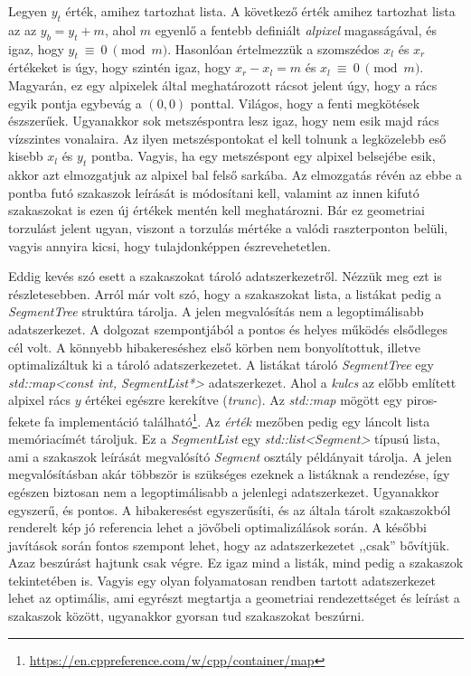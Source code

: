 \documentclass[12pt]{report}
\theoremstyle{definition}
\newcommand{\func}[1]{{\textsl{#1}}}
\begin{document}
Legyen $y_t$ érték, amihez tartozhat lista. A következő érték amihez tartozhat
lista az az $y_b = y_t + m$, ahol $m$ egyenlő a fentebb definiált
\emph{alpixel} magasságával, és igaz, hogy $y_t~\equiv~0~\pmod{m}$. Hasonlóan
értelmezzük a szomszédos $x_l$ és $x_r$ értékeket is úgy, hogy szintén igaz,
hogy $x_r - x_l = m$ és $x_l~\equiv~0~\pmod{m}$. Magyarán, ez egy alpixelek
által meghatározott rácsot jelent úgy, hogy a rács egyik pontja egybevág a $(0,
0)$ ponttal. Világos, hogy a fenti megkötések észszerűek. Ugyanakkor sok
metszéspontra lesz igaz, hogy nem esik majd rács vízszintes vonalaira. Az ilyen
metszéspontokat el kell tolnunk a legközelebb eső kisebb $x_l$ és $y_t$ pontba.
Vagyis, ha egy metszéspont egy alpixel belsejébe esik, akkor azt elmozgatjuk az
alpixel bal felső sarkába. Az elmozgatás révén az ebbe a pontba futó szakaszok
leírását is módosítani kell, valamint az innen kifutó szakaszokat is ezen új
értékek mentén kell meghatározni. Bár ez geometriai torzulást jelent ugyan,
viszont a torzulás mértéke a valódi raszterponton belüli, vagyis annyira kicsi,
hogy tulajdonképpen észrevehetetlen.

Eddig kevés szó esett a szakaszokat tároló adatszerkezetről. Nézzük meg ezt is
részletesebben. Arról már volt szó, hogy a szakaszokat lista, a listákat pedig
a \func{SegmentTree} struktúra tárolja. A jelen megvalósítás nem a
legoptimálisabb adatszerkezet. A dolgozat szempontjából a pontos és helyes
működés elsődleges cél volt. A könnyebb hibakereséshez első körben nem
bonyolítottuk, illetve optimalizáltuk ki a tároló adatszerkezetet. A listákat
tároló \func{SegmentTree} egy \func{std::map<const int, SegmentList*>}
adatszerkezet. Ahol a \emph{kulcs} az előbb említett alpixel rács $y$ értékei
egészre kerekítve (\func{trunc}). Az \func{std::map} mögött egy piros-fekete fa
implementáció található\footnote{
\footnotesize{\url{https://en.cppreference.com/w/cpp/container/map}}}. Az
\emph{érték} mezőben pedig egy láncolt lista memóriacímét tároljuk. Ez a
\func{SegmentList} egy \func{std::list<Segment>} típusú lista, ami a szakaszok
leírását megvalósító \func{Segment} osztály példányait tárolja. A jelen
megvalósításban akár többször is szükséges ezeknek a listáknak a rendezése, így
egészen biztosan nem a legoptimálisabb a jelenlegi adatszerkezet. Ugyanakkor
egyszerű, és pontos. A hibakeresést egyszerűsíti, és az általa tárolt
szakaszokból renderelt kép jó referencia lehet a jövőbeli optimalizálások
során. A későbbi javítások során fontos szempont lehet, hogy az adatszerkezetet
,,csak'' bővítjük. Azaz beszúrást hajtunk csak végre. Ez igaz mind a listák,
mind pedig a szakaszok tekintetében is. Vagyis egy olyan folyamatosan rendben
tartott adatszerkezet lehet az optimális, ami egyrészt megtartja a geometriai
rendezettséget és leírást a szakaszok között, ugyanakkor gyorsan tud
szakaszokat beszúrni.
\end{document}
